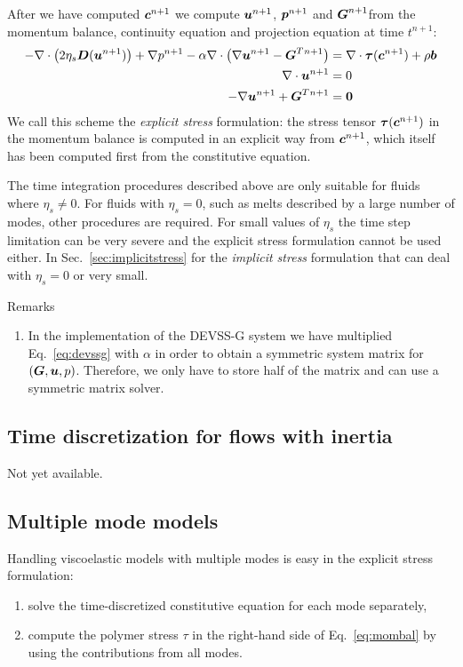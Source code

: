 After we have computed $\boldsymbol{c}^{n+1}$ we compute $\boldsymbol{u}^{n+1}$, 
$\boldsymbol{p}^{n+1}$ and $\boldsymbol{G}^{n+1}$from the momentum balance,
 continuity equation and projection equation at time $t^{n+1}$:
\begin{align}
      -\nabla\cdot\big(2\eta_s\boldsymbol{D}(\boldsymbol{u}^{n+1})\big) +\nabla p^{n+1} 
  -\alpha\nabla\cdot\big(\nabla\boldsymbol{u}^{n+1} -\boldsymbol{G}^T{}^{n+1} \big)
&=\nabla\cdot\boldsymbol{\tau}(\boldsymbol{c}^{n+1})
        + \rho\boldsymbol{b} \label{eq:mombal}\\
     \nabla\cdot\boldsymbol{u}^{n+1}&=0\\
   -\nabla\boldsymbol{u}^{n+1} + \boldsymbol{G}^T{}^{n+1} &= \boldsymbol{0}\label{eq:devssg}
\end{align}
We call this scheme the \emph{explicit stress} formulation: the stress tensor
$\boldsymbol{\tau}(\boldsymbol{c}^{n+1})$ in the momentum balance is computed in an
explicit way from $\boldsymbol{c}^{n+1}$, which itself has been computed first from the
constitutive equation.

The time integration procedures described above are only suitable for fluids
where $\eta_s\neq0$. For fluids with $\eta_s=0$, such as melts described by a
large number of modes, other procedures are required. For small values of
$\eta_s$ the time step limitation can be very severe and the explicit stress
formulation cannot be used either. In Sec.~\ref{sec:implicitstress} for the
\emph{implicit stress} formulation that can deal with $\eta_s=0$ or very small.

Remarks
\begin{enumerate}
   \item In the implementation of the DEVSS-G system we have multiplied
Eq.~\eqref{eq:devssg} with $\alpha$ in order to obtain a symmetric system
matrix for $(\boldsymbol{G},\boldsymbol{u}, p)$. Therefore, we only have to store
half of the matrix and can use a symmetric matrix solver.
\end{enumerate}

\subsection{Time discretization for flows with inertia}

Not yet available.

\subsection{Multiple mode models}

Handling viscoelastic models with multiple modes
is easy in the explicit stress formulation:
\begin{enumerate}
   \item solve the time-discretized constitutive equation for each mode
separately,
   \item compute the polymer stress $\tau$ in the right-hand side of
Eq.~\eqref{eq:mombal} by using the contributions from all modes.

\end{enumerate}

